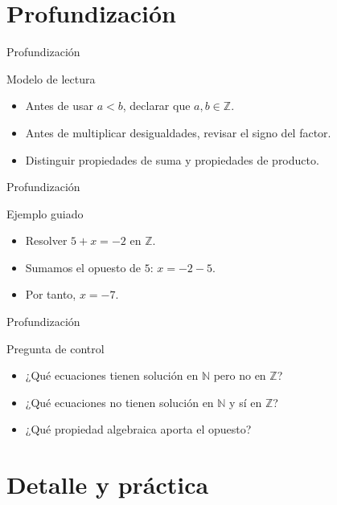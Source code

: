 \documentclass[aspectratio=169,11pt]{beamer}
\begin{document}
\section{Profundización}

\begin{frame}{Profundización}
\begin{block}{Modelo de lectura}
\begin{itemize}
  \item Antes de usar \(a< b\), declarar que \(a,b\in\mathbb{Z}\).
  \item Antes de multiplicar desigualdades, revisar el signo del factor.
  \item Distinguir propiedades de suma y propiedades de producto.
\end{itemize}
\end{block}
\end{frame}

\begin{frame}{Profundización}
\begin{block}{Ejemplo guiado}
\begin{itemize}
  \item Resolver \(5+x=-2\) en \(\mathbb{Z}\).
  \item Sumamos el opuesto de \(5\): \(x=-2-5\).
  \item Por tanto, \(x=-7\).
\end{itemize}
\end{block}
\end{frame}

\begin{frame}{Profundización}
\begin{block}{Pregunta de control}
\begin{itemize}
  \item ¿Qué ecuaciones tienen solución en \(\mathbb{N}\) pero no en \(\mathbb{Z}\)?
  \item ¿Qué ecuaciones no tienen solución en \(\mathbb{N}\) y sí en \(\mathbb{Z}\)?
  \item ¿Qué propiedad algebraica aporta el opuesto?
\end{itemize}
\end{block}
\end{frame}


\section{Detalle y práctica}
\end{document}
